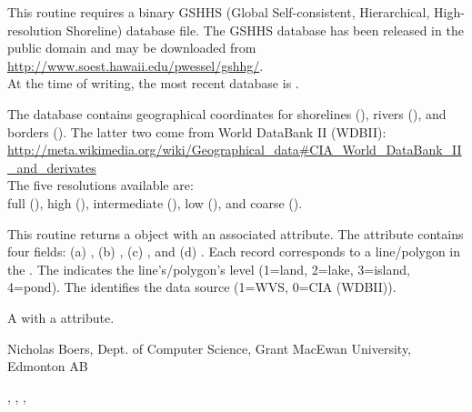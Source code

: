 \documentclass[letterpaper]{book}
\begin{document}
\begin{Details}\relax
This routine requires a binary GSHHS (Global Self-consistent,
Hierarchical, High-resolution Shoreline) database file. The GSHHS
database has been released in the public domain and may be downloaded
from \\{} \url{http://www.soest.hawaii.edu/pwessel/gshhg/}. \\{}  At the time of
writing, the most recent database is .

The database  contains geographical coordinates for 
shorelines (), rivers (), and borders ().
The latter two come from World DataBank II (WDBII): \\{}
\url{http://meta.wikimedia.org/wiki/Geographical_data#CIA_World_DataBank_II_and_derivates} \\{}
The five resolutions available are: \\{}
full (), high (), intermediate (), low (), and coarse ().

This routine returns a  object with an associated
 attribute. The attribute contains four fields: (a)
, (b) , (c) , and (d) .
Each record corresponds to a line/polygon in the .  The
 indicates the line's/polygon's level (1=land, 2=lake,
3=island, 4=pond). The  identifies the data source
(1=WVS, 0=CIA (WDBII)).
\end{Details}
%
\begin{Value}
A  with a  attribute.
\end{Value}
%
\begin{Author}\relax
Nicholas Boers, Dept. of Computer Science, Grant MacEwan University, Edmonton AB
\end{Author}
%
\begin{SeeAlso}\relax
{}, , 
,  
\end{SeeAlso}
%
\end{document}
